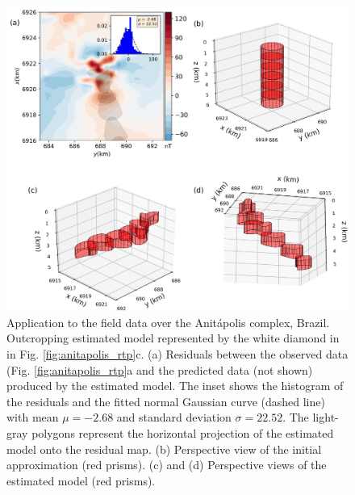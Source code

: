 \begin{figure}
    \centering
    \includegraphics[width=\linewidth]{figures/real_results_white_diamond.png}
    \caption{Application to the field data over the Anit{\'a}polis complex, Brazil.
    Outcropping estimated model  represented by the white diamond in in Fig.    		   \ref{fig:anitapolis_rtp}c. 
    (a) Residuals between the observed data (Fig. \ref{fig:anitapolis_rtp}a and the 
    predicted data (not shown) produced by the estimated model. 
    The inset shows the histogram of the residuals and the fitted normal 
    Gaussian curve (dashed line) with mean $\mu = -2.68$ and standard deviation  
    $\sigma = 22.52$.
    The light-gray polygons represent the horizontal projection of the estimated 
    model onto the residual map. 
    (b) Perspective view of the initial approximation (red prisms). 
    (c) and (d) Perspective views of the estimated model (red prisms).}
    \label{fig:real_result}
\end{figure}